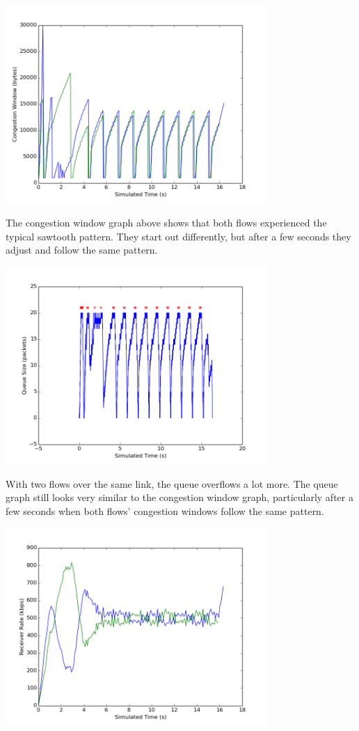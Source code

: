 \documentclass[11pt]{article}
\begin{document}
\includegraphics[width=10cm]{../graphs/two_flow_cwnd.png}

The congestion window graph above shows that both flows experienced the typical sawtooth pattern. They start out differently, but after a few seconds they adjust and follow the same pattern.

\includegraphics[width=10cm]{../graphs/two_flow_queue_size.png}

With two flows over the same link, the queue overflows a lot more. The queue graph still looks very similar to the congestion window graph, particularly after a few seconds when both flows' congestion windows follow the same pattern.

\includegraphics[width=10cm]{../graphs/two_flow_receiver_rate.png}
\end{document}
